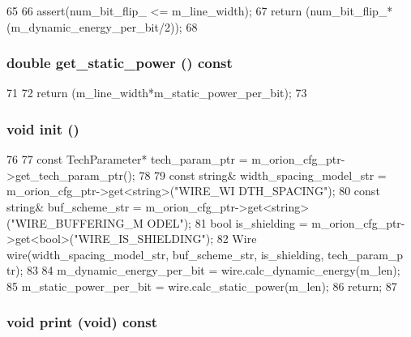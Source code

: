 \begin{DoxyCode}
65 {
66     assert(num_bit_flip_ <= m_line_width);
67     return (num_bit_flip_*(m_dynamic_energy_per_bit/2));
68 }
\end{DoxyCode}
\hypertarget{classOrionLink_aeb5933543cfdeb1668baed5ce7c68351}{
\subsubsection[{get\_\-static\_\-power}]{\setlength{\rightskip}{0pt plus 5cm}double get\_\-static\_\-power () const}}
\label{classOrionLink_aeb5933543cfdeb1668baed5ce7c68351}



\begin{DoxyCode}
71 {
72     return (m_line_width*m_static_power_per_bit);
73 }
\end{DoxyCode}
\hypertarget{classOrionLink_a02fd73d861ef2e4aabb38c0c9ff82947}{
\subsubsection[{init}]{\setlength{\rightskip}{0pt plus 5cm}void init ()}}
\label{classOrionLink_a02fd73d861ef2e4aabb38c0c9ff82947}



\begin{DoxyCode}
76 {
77     const TechParameter* tech_param_ptr = m_orion_cfg_ptr->get_tech_param_ptr();
78 
79     const string& width_spacing_model_str = m_orion_cfg_ptr->get<string>("WIRE_WI
      DTH_SPACING");
80     const string& buf_scheme_str = m_orion_cfg_ptr->get<string>("WIRE_BUFFERING_M
      ODEL");
81     bool is_shielding = m_orion_cfg_ptr->get<bool>("WIRE_IS_SHIELDING");
82     Wire wire(width_spacing_model_str, buf_scheme_str, is_shielding, tech_param_p
      tr);
83 
84     m_dynamic_energy_per_bit = wire.calc_dynamic_energy(m_len);
85     m_static_power_per_bit = wire.calc_static_power(m_len);
86     return;
87 }
\end{DoxyCode}
\hypertarget{classOrionLink_a3a3ab31c19c38fe926198ddc4a0a4a91}{
\subsubsection[{print}]{\setlength{\rightskip}{0pt plus 5cm}void print (void) const}}
\label{classOrionLink_a3a3ab31c19c38fe926198ddc4a0a4a91}



